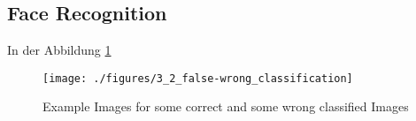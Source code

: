 \subsection{Face Recognition}




In der Abbildung \ref{fig:face_false_wrong}

\begin{figure}[hp!]
\begin{center}
 \texttt{[image: ./figures/3\_2\_false-wrong\_classification]}
 \caption{Example Images for some correct and some wrong classified Images}
\label{fig:face_false_wrong}
\end{center}
\end{figure}